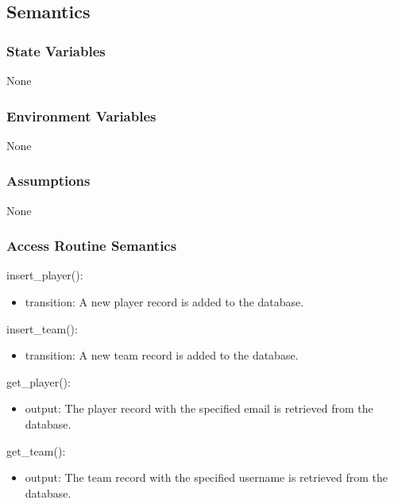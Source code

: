 \documentclass[12pt, titlepage]{article}
\begin{document}
\subsection{Semantics}

\subsubsection{State Variables}

None

\subsubsection{Environment Variables}

None

\subsubsection{Assumptions}


None

\subsubsection{Access Routine Semantics}

\noindent insert\_player():
\begin{itemize}
\item transition: A new player record is added to the database.
\end{itemize}

\noindent insert\_team():
\begin{itemize}
\item transition: A new team record is added to the database.
\end{itemize}

\noindent get\_player():
\begin{itemize}
\item output: The player record with the specified email is retrieved from the database.
\end{itemize}

\noindent get\_team():
\begin{itemize}
\item output: The team record with the specified username is retrieved from the database.
\end{itemize}
\end{document}
